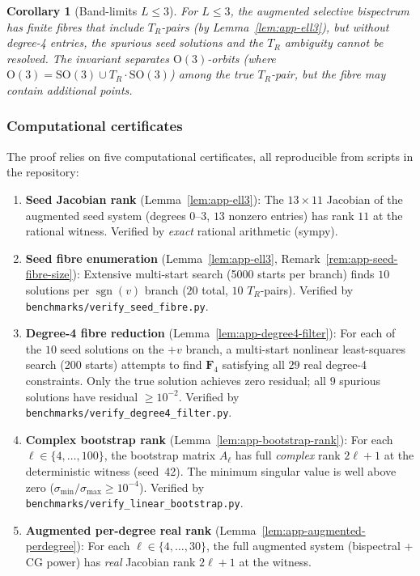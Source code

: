 \documentclass{article}
\newtheorem{corollary}[theorem]{Corollary}
\theoremstyle{definition}
\theoremstyle{remark}
\DeclareMathOperator{\sgn}{sgn}
\newcommand{\SO}{\mathrm{SO}}
\newcommand{\OG}{\mathrm{O}}
\theoremstyle{definition}
\begin{document}
\begin{corollary}[Band-limits $L \le 3$]
For $L \le 3$, the augmented selective bispectrum has finite fibres
that include $T_R$-pairs (by Lemma~\ref{lem:app-ell3}), but without
degree-4 entries, the spurious seed solutions and the $T_R$ ambiguity
cannot be resolved.
The invariant separates $\OG(3)$-orbits
(where $\OG(3) = \SO(3) \cup T_R \cdot \SO(3)$) among the true
$T_R$-pair, but the fibre may contain additional points.
\end{corollary}

\subsubsection{Computational certificates}

The proof relies on five computational certificates, all reproducible
from scripts in the repository:
\begin{enumerate}[nosep]
\item \textbf{Seed Jacobian rank} (Lemma~\ref{lem:app-ell3}):
  The $13 \times 11$ Jacobian of the augmented seed system
  (degrees $0$--$3$, $13$ nonzero entries) has rank $11$ at the rational
  witness.
  Verified by \emph{exact} rational arithmetic (sympy).

\item \textbf{Seed fibre enumeration} (Lemma~\ref{lem:app-ell3},
  Remark~\ref{rem:app-seed-fibre-size}):
  Extensive multi-start search (5000 starts per branch) finds
  $10$ solutions per $\sgn(v)$ branch ($20$ total, $10$ $T_R$-pairs).
  Verified by \texttt{benchmarks/verify\_seed\_fibre.py}.

\item \textbf{Degree-4 fibre reduction}
  (Lemma~\ref{lem:app-degree4-filter}):
  For each of the $10$ seed solutions on the $+v$ branch, a
  multi-start nonlinear least-squares search (200 starts) attempts to
  find $\mathbf{F}_4$ satisfying all $29$ real degree-4 constraints.
  Only the true solution achieves zero residual; all $9$ spurious
  solutions have residual $\ge 10^{-2}$.
  Verified by \texttt{benchmarks/verify\_degree4\_filter.py}.

\item \textbf{Complex bootstrap rank} (Lemma~\ref{lem:app-bootstrap-rank}):
  For each $\ell \in \{4, \ldots, 100\}$, the bootstrap matrix $A_\ell$
  has full \emph{complex} rank $2\ell+1$ at the deterministic witness
  (seed~42).  The minimum singular value is well above zero
  ($\sigma_{\min} / \sigma_{\max} \ge 10^{-4}$).
  Verified by \texttt{benchmarks/verify\_linear\_bootstrap.py}.

\item \textbf{Augmented per-degree real rank}
  (Lemma~\ref{lem:app-augmented-perdegree}):
  For each $\ell \in \{4, \ldots, 30\}$, the full augmented system
  (bispectral + CG power) has \emph{real} Jacobian rank $2\ell+1$
  at the witness.
\end{enumerate}
\end{document}
